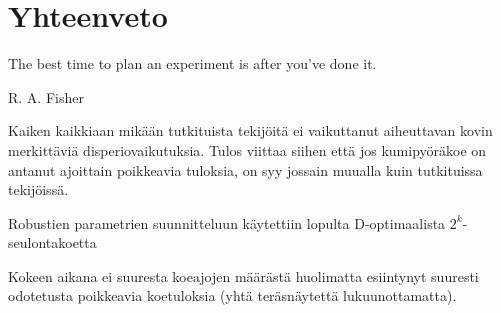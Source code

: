 \documentclass[12pt,a4paper,finnish]{tutthesis}
\begin{document}
\chapter{Yhteenveto}
\label{ch:concl}

\epigraph{The best time to plan an experiment is after you’ve done it.}{R. A. Fisher}


Kaiken kaikkiaan mikään tutkituista tekijöitä ei vaikuttanut aiheuttavan
kovin merkittäviä disperiovaikutuksia. Tulos viittaa siihen että jos kumipyöräkoe
on antanut ajoittain poikkeavia tuloksia, on syy jossain muualla kuin tutkituissa
tekijöissä.


Robustien parametrien suunnitteluun käytettiin lopulta D-optimaalista
$2^k$-seulontakoetta



Kokeen aikana ei suuresta koeajojen määrästä huolimatta esiintynyt
suuresti odotetusta poikkeavia koetuloksia (yhtä teräsnäytettä lukuunottamatta).





























\end{document}
